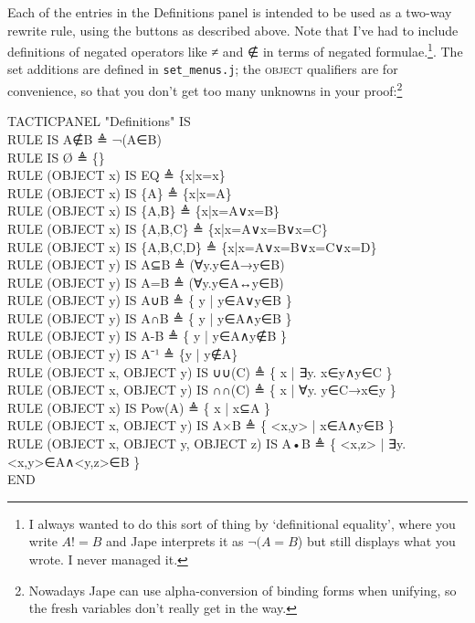 Each of the entries in the Definitions panel is intended to be used as a two-way rewrite rule, using the buttons as described above. Note that I've had to include definitions of negated operators like ≠ and ∉ in terms of negated formulae.\footnote{I always wanted to do this sort of thing by `definitional equality', where you write $A!=B$ and Jape interprets it as $¬(A=B$) but still displays what you wrote. I never managed it.}. The set additions are defined in \texttt{set\_menus.j}; the \textsc{object} qualifiers are for convenience, so that you don't get too many unknowns in your proof:\footnote{Nowadays Jape can use alpha-conversion of binding forms when unifying, so the fresh variables don't really get in the way.}
\begin{japeish}
TACTICPANEL "Definitions" IS \\
\tab RULE IS A∉B ≜ ¬(A∈B) \\
\tab RULE IS Ø ≜ \{\} \\
\tab RULE (OBJECT x) IS EQ ≜ \{x|x=x\} \\
\tab RULE (OBJECT x) IS \{A\} ≜ \{x|x=A\} \\
\tab RULE (OBJECT x) IS \{A,B\} ≜ \{x|x=A∨x=B\} \\
\tab RULE (OBJECT x) IS \{A,B,C\} ≜ \{x|x=A∨x=B∨x=C\} \\
\tab RULE (OBJECT x) IS \{A,B,C,D\} ≜ \{x|x=A∨x=B∨x=C∨x=D\} \\
\tab RULE (OBJECT y) IS A⊆B ≜ (∀y.y∈A→y∈B) \\
\tab RULE (OBJECT y) IS A=B ≜ (∀y.y∈A↔y∈B) \\
\tab RULE (OBJECT y) IS A∪B ≜ \{ y | y∈A∨y∈B \} \\
\tab RULE (OBJECT y) IS A∩B ≜ \{ y | y∈A∧y∈B \} \\
\tab RULE (OBJECT y) IS A-B ≜ \{ y | y∈A∧y∉B \} \\
\tab RULE (OBJECT y) IS A⁻¹ ≜ \{y | y∉A\} \\
\tab RULE (OBJECT x, OBJECT y) IS ∪∪(C) ≜ \{ x | ∃y. x∈y∧y∈C \} \\
\tab RULE (OBJECT x, OBJECT y) IS ∩∩(C) ≜ \{ x | ∀y. y∈C→x∈y \} \\
\tab RULE (OBJECT x) IS Pow(A) ≜ \{ x | x⊆A \} \\
\tab RULE (OBJECT x, OBJECT y) IS A×B ≜ \{ <x,y>  | x∈A∧y∈B \} \\
\tab RULE (OBJECT x, OBJECT y, OBJECT z) IS A•B ≜ \{ <x,z> | ∃y.<x,y>∈A∧<y,z>∈B \} \\
END
\end{japeish}

